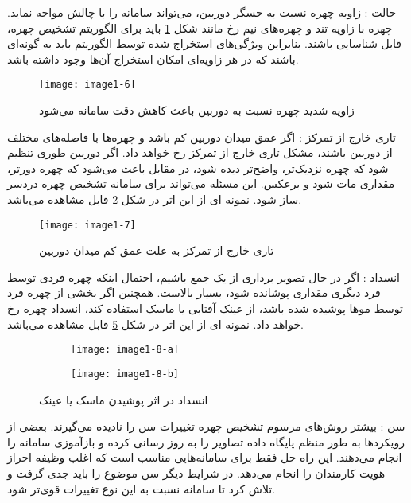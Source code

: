\noindent
حالت : زاویه چهره نسبت به حسگر دوربین، می‌تواند سامانه را با چالش مواجه نماید. چهره با زاویه تند و چهره‌های نیم رخ مانند شکل \ref{image1-6} باید برای الگوریتم تشخیص چهره، قابل شناسایی باشند. بنابراین ویژگی‌های استخراج شده توسط الگوریتم باید به گونه‌ای باشند که در هر زاویه‌ای امکان استخراج آن‌ها وجود داشته باشد.
\begin{figure}[!h]
\centering
\texttt{[image: image1-6]}
\caption{زاویه شدید چهره نسبت به دوربین باعث کاهش دقت سامانه می‌شود \cite{6475017}}
\label{image1-6}
\end{figure}

\noindent
تاری خارج از تمرکز : اگر عمق میدان دوربین کم باشد و چهره‌ها با فاصله‌های مختلف از دوربین باشند، مشکل تاری خارج از تمرکز رخ خواهد داد. اگر دوربین طوری تنظیم شود که چهره نزدیک‌تر، واضح‌تر دیده شود، در مقابل باعث می‌شود که چهره دورتر، مقداری مات شود و برعکس. این مسئله می‌تواند برای سامانه تشخیص چهره دردسر ساز شود. نمونه ای از این اثر در شکل \ref{image1-7} قابل مشاهده می‌باشد.

\begin{figure}[!h]
\centering
\texttt{[image: image1-7]}
\caption{تاری خارج از تمرکز به علت عمق کم میدان دوربین \cite{7477452}}
\label{image1-7}
\end{figure}

\noindent
انسداد : اگر در حال تصویر برداری از یک جمع باشیم، احتمال اینکه چهره فردی توسط فرد دیگری مقداری پوشانده شود، بسیار بالاست. همچنین اگر بخشی از چهره فرد توسط موها پوشیده شده باشد، از عینک آفتابی یا ماسک استفاده کند، انسداد چهره رخ خواهد داد. نمونه ای از این اثر در شکل \ref{image1-8} قابل مشاهده می‌باشد.

\begin{figure}
	\centering
	\begin{subfigure}{.25\textwidth}
		\centering
		\texttt{[image: image1-8-a]}
		\label{image1-8-a}
	\end{subfigure}
	\begin{subfigure}{.25\textwidth}
		\centering
		\texttt{[image: image1-8-b]}
		\label{image1-8-b}
	\end{subfigure}
	\caption{انسداد در اثر پوشیدن ماسک یا عینک}
	\label{image1-8}
\end{figure}

\noindent
سن : بیشتر روش‌های مرسوم تشخیص چهره تغییرات سن را نادیده می‌گیرند. بعضی از رویکردها به طور منظم پایگاه داده تصاویر را به روز رسانی کرده و بازآموزی سامانه را انجام می‌دهند. این راه حل فقط برای سامانه‌هایی مناسب است که اغلب وظیفه احراز هویت کارمندان را انجام می‌دهد. در شرایط دیگر سن موضوع را باید جدی گرفت و تلاش کرد تا سامانه نسبت به این نوع تغییرات قوی‌تر شود.

